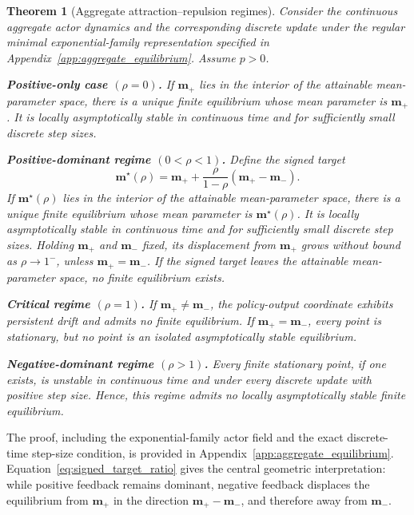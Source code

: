 \documentclass{article}
\theoremstyle{plain}
\newtheorem{theorem}{Theorem}[section]
\theoremstyle{definition}
\theoremstyle{remark}
\begin{document}
\begin{theorem}[Aggregate attraction--repulsion regimes]
\label{thm:aggregate_equilibria}
Consider the continuous aggregate actor dynamics and the corresponding
discrete update under the regular minimal exponential-family
representation specified in
Appendix~\ref{app:aggregate_equilibrium}. Assume \(p>0\).

\textbf{Positive-only case \((\rho=0)\).}
If \(\mathbf m_+\) lies in the interior of the attainable mean-parameter
space, there is a unique finite equilibrium whose mean parameter is
\(\mathbf m_+\). It is locally asymptotically stable in continuous time
and for sufficiently small discrete step sizes.

\textbf{Positive-dominant regime \((0<\rho<1)\).}
Define the signed target
\begin{equation}
    \mathbf m^\star(\rho)
    =
    \mathbf m_+
    +
    \frac{\rho}{1-\rho}
    \left(
        \mathbf m_+-\mathbf m_-
    \right).
    \label{eq:signed_target_ratio}
\end{equation}
If \(\mathbf m^\star(\rho)\) lies in the interior of the attainable
mean-parameter space, there is a unique finite equilibrium whose mean
parameter is \(\mathbf m^\star(\rho)\). It is locally asymptotically
stable in continuous time and for sufficiently small discrete step
sizes. Holding \(\mathbf m_+\) and \(\mathbf m_-\) fixed, its displacement
from \(\mathbf m_+\) grows without bound as \(\rho\to1^-\), unless
\(\mathbf m_+=\mathbf m_-\). If the signed target leaves the attainable
mean-parameter space, no finite equilibrium exists.

\textbf{Critical regime \((\rho=1)\).}
If \(\mathbf m_+\neq\mathbf m_-\), the policy-output coordinate exhibits
persistent drift and admits no finite equilibrium. If
\(\mathbf m_+=\mathbf m_-\), every point is stationary, but no point is
an isolated asymptotically stable equilibrium.

\textbf{Negative-dominant regime \((\rho>1)\).}
Every finite stationary point, if one exists, is unstable in continuous
time and under every discrete update with positive step size. Hence,
this regime admits no locally asymptotically stable finite equilibrium.
\end{theorem}

The proof, including the exponential-family actor field and the exact
discrete-time step-size condition, is provided in
Appendix~\ref{app:aggregate_equilibrium}.
Equation~\eqref{eq:signed_target_ratio} gives the central geometric
interpretation: while positive feedback remains dominant, negative
feedback displaces the equilibrium from \(\mathbf m_+\) in the direction
\(\mathbf m_+-\mathbf m_-\), and therefore away from
\(\mathbf m_-\).
\end{document}

